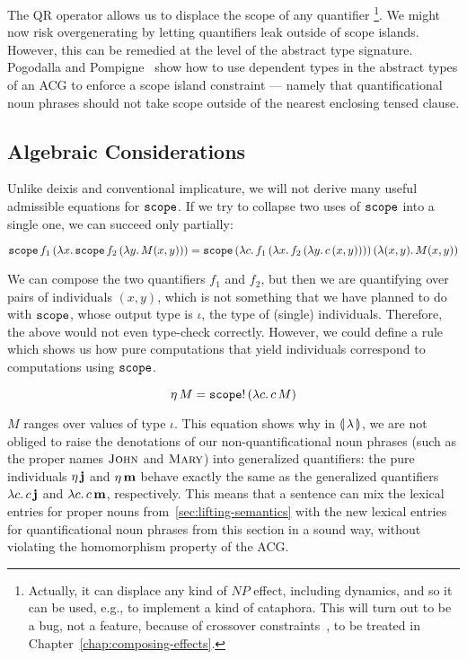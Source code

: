 The QR operator allows us to displace the scope of any quantifier
\footnote{Actually, it can displace any kind of $NP$ effect, including
  dynamics, and so it can be used, e.g., to implement a kind of
  cataphora. This will turn out to be a bug, not a feature, because of
  crossover constraints~\cite{shan2006explaining}, to be treated in
  Chapter~\ref{chap:composing-effects}.}. We might now risk overgenerating
by letting quantifiers leak outside of scope islands. However, this can be
remedied at the level of the abstract type signature. Pogodalla and
Pompigne~\cite{pogodalla2012controlling} show how to use dependent types in
the abstract types of an ACG to enforce a scope island constraint ---
namely that quantificational noun phrases should not take scope outside of
the nearest enclosing tensed clause.


\subsection{Algebraic Considerations}
\label{ssec:algebraic-quantification}

Unlike deixis and conventional implicature, we will not derive many useful
admissible equations for $\mathtt{scope}$. If we try to collapse two uses of
$\mathtt{scope}$ into a single one, we can succeed only partially:

$$
\mathtt{scope}\,f_1\,(\lambda x.\, \mathtt{scope}\,f_2\,(\lambda y.\, M(x,y)))
= \mathtt{scope}\,(\lambda c.\, f_1\,(\lambda x.\, f_2\,(\lambda y.\, c\,(x,y))))\,(\lambda (x,y).\, M(x,y))
$$

We can compose the two quantifiers $f_1$ and $f_2$, but then we are
quantifying over pairs of individuals $(x,y)$, which is not something that
we have planned to do with $\mathtt{scope}$, whose output type is $\iota$, the
type of (single) individuals. Therefore, the above would not even
type-check correctly. However, we could define a rule which shows us how
pure computations that yield individuals correspond to computations using
$\mathtt{scope}$.

$$
\eta\,M = \mathtt{scope}!\,(\lambda c.\, c\,M)
$$

$M$ ranges over values of type $\iota$. This equation shows why in
$\llparenthesis \, \lambda \, \rrparenthesis$, we are not obliged to raise the denotations of our
non-quantificational noun phrases (such as the proper names $\textsc{John}$
and $\textsc{Mary}$) into generalized quantifiers: the pure individuals
$\eta\,\textbf{j}$ and $\eta\,\textbf{m}$ behave exactly the same as the
generalized quantifiers $\lambda c.\, c\,\textbf{j}$ and
$\lambda c.\, c\,\textbf{m}$, respectively. This means that a sentence can
mix the lexical entries for proper nouns from~\ref{sec:lifting-semantics}
with the new lexical entries for quantificational noun phrases from this
section in a sound way, without violating the homomorphism property of the
ACG.

